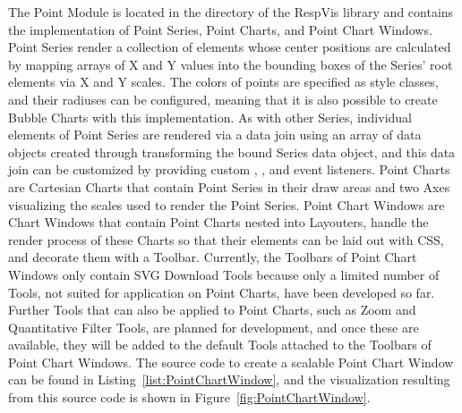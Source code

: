 The Point Module is located in the  directory of the RespVis library and contains the implementation of Point Series, Point Charts, and Point Chart Windows.
Point Series render a collection of  elements whose center positions are calculated by mapping arrays of X and Y values into the bounding boxes of the Series' root elements via X and Y scales.
The colors of points are specified as style classes, and their radiuses can be configured, meaning that it is also possible to create Bubble Charts with this implementation.
As with other Series, individual elements of Point Series are rendered via a data join using an array of data objects created through transforming the bound Series data object, and this data join can be customized by providing custom , , and  event listeners.
Point Charts are Cartesian Charts that contain Point Series in their draw areas and two Axes visualizing the scales used to render the Point Series.
Point Chart Windows are Chart Windows that contain Point Charts nested into Layouters, handle the render process of these Charts so that their elements can be laid out with CSS,  and decorate them with a Toolbar.
Currently, the Toolbars of Point Chart Windows only contain SVG Download Tools because only a limited number of Tools, not suited for application on Point Charts, have been developed so far.
Further Tools that can also be applied to Point Charts, such as Zoom and Quantitative Filter Tools, are planned for development, and once these are available, they will be added to the default Tools attached to the Toolbars of Point Chart Windows.
The source code to create a scalable Point Chart Window can be found in Listing~\ref{list:PointChartWindow}, and the visualization resulting from this source code is shown in Figure~\ref{fig:PointChartWindow}.